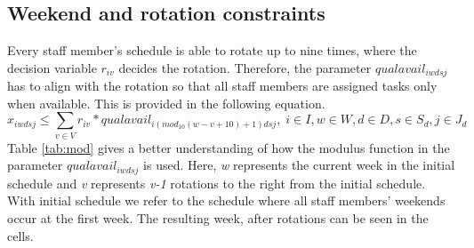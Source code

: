 \subsection{Weekend and rotation constraints} \label{section:weekend_rot_constraints}
Every staff member's schedule is able to rotate up to nine times, where the decision variable $r_{iv}$ decides the rotation. Therefore, the parameter $qualavail_{iwdsj}$ has to align with the rotation so that all staff members are assigned tasks only when available. This is provided in the following equation.
\begin{equation} \label{constr:qualavail}
x_{iwdsj} \leq \sum_{v \in V} r_{iv}*qualavail_{i(mod_{10}(w-v+10)+1)dsj}, \;   i \in I, w \in W, d \in D, s \in S_d, j \in J_d
\end{equation}
Table \ref{tab:mod} gives a better understanding of how the modulus function in the parameter $qualavail_{iwdsj}$ is used. Here, \textit{w} represents the current week in the initial schedule and \textit{v} represents \textit{v-1} rotations to the right from the initial schedule. With initial schedule we refer to the schedule where all staff members' weekends occur at the first week. The resulting week, after rotations can be seen in the cells.
